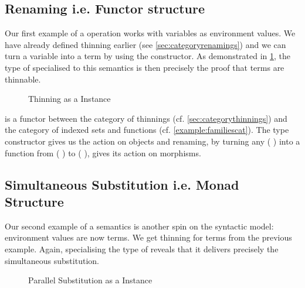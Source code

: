 \subsection{Renaming i.e. Functor structure}

Our first example of a  operation works with variables as
environment values. We have already defined thinning earlier (see
\cref{sec:categoryrenamings}) and we can turn a variable into a term by using
the  constructor. As demonstrated in \cref{fig:synren},
the type of  specialised to this
semantics is then precisely the proof that terms are thinnable.

\begin{figure}[h]
\begin{minipage}[t]{0.5\textwidth}
\end{minipage}\begin{minipage}[t]{0.5\textwidth}
\end{minipage}
\caption{Thinning as a  Instance\label{fig:synren}}
\end{figure}

 is a functor between the category of thinnings
(cf. \cref{sec:categorythinnings}) and the category of indexed sets and
functions (cf. \cref{example:familiescat}). The type constructor
gives us the action on objects and renaming, by turning any
{(  )} into a function from
{(  )} to {(  )}, gives
its action on morphisms.

\subsection{Simultaneous Substitution i.e. Monad Structure}

Our second example of a semantics is another spin on the syntactic model:
environment values are now terms. We get thinning for terms from the
previous example. Again, specialising the type of 
reveals that it delivers precisely the simultaneous substitution.

\begin{figure}[h]
\begin{minipage}[t]{0.4\textwidth}
\end{minipage}\begin{minipage}[t]{0.6\textwidth}
\end{minipage}
\caption{Parallel Substitution as a  Instance\label{fig:synsub}}
\end{figure}

